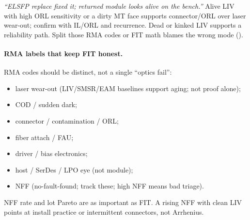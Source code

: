 \emph{``ELSFP replace fixed it; returned module looks alive on the bench.''}
Alive LIV with high ORL sensitivity or a dirty MT face supports connector/ORL
over laser wear-out; confirm with IL/ORL and recurrence. Dead or kinked LIV
supports a reliability path. Split those RMA codes or FIT math blames the wrong
mode ().

\paragraph{RMA labels that keep FIT honest.}
RMA codes should be distinct, not a single ``optics fail'':
\begin{itemize}
\item laser wear-out (LIV/SMSR/EAM baselines support aging; not proof alone);
\item COD / sudden dark;
\item connector / contamination / ORL;
\item fiber attach / FAU;
\item driver / bias electronics;
\item host / SerDes / LPO eye (not module);
\item NFF (no-fault-found; track these; high NFF means bad triage).
\end{itemize}
NFF rate and lot Pareto are as important as FIT. A rising NFF with clean LIV
points at install practice or intermittent connectors, not Arrhenius.


